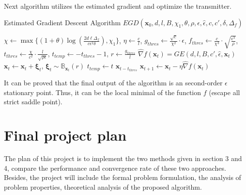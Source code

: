 \documentclass[12pt,a4paper]{article}
\begin{document}
	\par Next algorithm utilizes the estimated gradient and optimize the transmitter.
	\begin{algorithm}[h]
		\label{PGD-MF}
		\caption{Estimated Gradient Descent Algorithm $EGD(\bm{x}_0,d,l,B,\chi_1,\theta,\rho,\epsilon,\hat{\epsilon},c,c',\delta,\Delta_f)$}
		\begin{algorithmic}[1]
			\State $\chi \leftarrow \max\{(1+\theta)\log(\frac{2d\ell\Delta_f}{c\epsilon^2\delta}), \chi_1\}$, $\eta\leftarrow\frac{c}{l}$, $g_{thres}\leftarrow\frac{\sqrt{c}}{\chi^2}\cdot\epsilon$, $f_{thres}\leftarrow\frac{c}{\chi^3}\cdot\sqrt{\frac{\epsilon^3}{\rho}}$, $t_{thres}\leftarrow\frac{\chi}{c^2}\cdot\frac{l}{\sqrt{\rho\epsilon}}$, $t_{temp}\leftarrow-t_{thres}-1$, $r\leftarrow \frac{g_{thres}}{l}$
			\State $\hat{\nabla}f(\bm{x}_t)=GE(d,l,B,c',\hat{\epsilon},\bm{x}_t)$
			\State $\bm{x}_t\leftarrow\bm{x}_t+\bm{\xi}_t$, $\bm{\xi}_t\sim\mathbb{B}_{\bm{x}_t}(r)$
			\State $t_{temp}\leftarrow t$
			\EndIf
			\State \Return $\bm{x}_{t-t_{thres}}$
			\EndIf
			\State $\bm{x}_{t+1}\leftarrow\bm{x}_t-\eta\hat{\nabla}f(\bm{x}_t)$
			\EndFor
		\end{algorithmic}
	\end{algorithm}
	\par It can be proved that the final output of the algorithm is an second-order $\epsilon$ stationary point. Thus, it can be the local minimal of the function $f$ (escape all strict saddle point). 
	\section{Final project plan}
	\noindent
	\par The plan of this project is to implement the two methods given in section 3 and 4, compare the performance and convergence rate of these two approaches. Besides, the project will include the formal problem formulation, the analysis of problem properties, theoretical analysis of the proposed algorithm.
		
	
\end{document}
